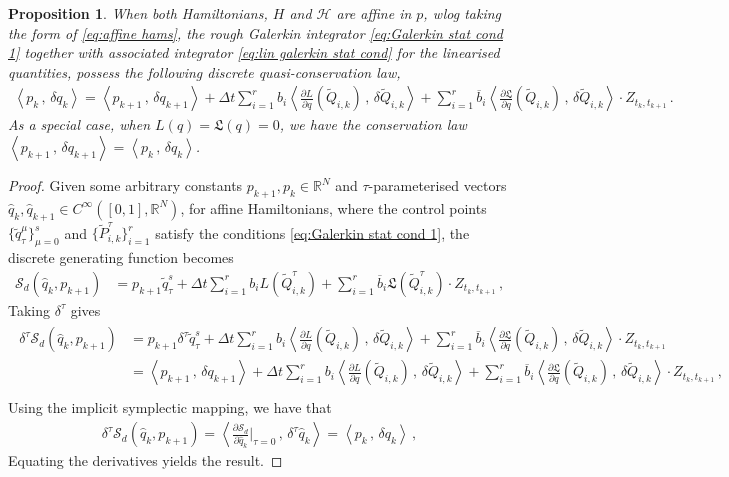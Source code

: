 \documentclass[11pt, oneside]{article}
\numberwithin{equation}{section}
\newtheorem{proposition}[lemma]{Proposition}
\theoremstyle{definition}
\newcommand{\ob}[1]{\overline{#1}}
\newcommand{\wt}[1]{\widetilde{#1}}
\newcommand{\wh}[1]{\widehat{#1}}
\newcommand{\mc}[1]{\mathcal{#1}}
\newcommand{\mcal}[1]{\mc{#1}}
\newcommand{\scp}[2]{{\left\langle {#1}\, , \, {#2}\right\rangle}}
\def\p{{\partial}}
\def\p{\partial}
\begin{document}
\begin{proposition}\label{prop:numerical 1-form conservation}
    When both Hamiltonians, $H$ and $\mcal{H}$ are affine in $p$, wlog taking the form of \eqref{eq:affine hams}, the rough Galerkin integrator \eqref{eq:Galerkin stat cond 1} together with associated integrator \eqref{eq:lin galerkin stat cond} for the linearised quantities, possess the following discrete quasi-conservation law,
    \begin{align}\label{eq:numerical 1-form conservation}
        \scp{p_k}{\delta q_k} = \scp{p_{k+1}}{\delta q_{k+1}} + \Delta t\sum_{i=1}^r b_i \scp{\frac{\p L}{\p q}(\wt{Q}_{i,k})}{\delta \wt{Q}_{i,k}} + \sum_{i=1}^r \ob{b}_i\scp{\frac{\p \mathfrak{L}}{\p q}(\wt{Q}_{i,k})}{\delta \wt{Q}_{i,k}}\cdot Z_{t_k, t_{k+1}}\,.
    \end{align}
    As a special case, when $L(q) = \mathfrak{L}(q) = 0$, we have the conservation law $\scp{p_{k+1}}{\delta q_{k+1}} = \scp{p_k}{\delta q_k}$.
\end{proposition}
\begin{proof}
Given some arbitrary constants $p_{k+1}, p_k \in \mathbb{R}^N$ and $\tau$-parameterised vectors $\wh{q}_k, \wh{q}_{k+1} \in C^\infty([0,1], \mathbb{R}^N)$, for affine Hamiltonians, where the control points $\{\wt{q}^\mu_\tau\}_{\mu=0}^s$ and $\{\wt{P}^\tau_{i,k}\}_{i=1}^r$ satisfy the conditions \eqref{eq:Galerkin stat cond 1}, the discrete generating function becomes
    \begin{align*}
    \mcal{S}_d(\wh{q}_k, p_{k+1})&= p_{k+1}\wt{q}^s_\tau + \Delta t \sum_{i=1}^r b_i L(\wt{Q}^\tau_{i,k}) + \sum_{i=1}^r \ob{b}_i\mathfrak{L}(\wt{Q}^\tau_{i,k})\cdot Z_{t_k, t_{k+1}}\,,
    \end{align*}
    Taking $\delta^\tau$ gives
    \begin{align*}
        \begin{split}
            \delta^\tau \mcal{S}_d(\wh{q}_k, p_{k+1}) &= p_{k+1}\delta^\tau \wt{q}^s_\tau + \Delta t\sum_{i=1}^rb_i\scp{\frac{\p L}{\p q}(\wt{Q}_{i,k})}{\delta \wt{Q}_{i,k}} +  \sum_{i=1}^r \ob{b}_i\scp{\frac{\p \mathfrak{L}}{\p q}(\wt{Q}_{i,k})}{\delta \wt{Q}_{i,k}}\cdot Z_{t_k, t_{k+1}}\\
            &= \scp{p_{k+1}}{\delta q_{k+1}} + \Delta t\sum_{i=1}^rb_i\scp{\frac{\p L}{\p q}(\wt{Q}_{i,k})}{\delta \wt{Q}_{i,k}} + \sum_{i=1}^r \ob{b}_i\scp{\frac{\p \mathfrak{L}}{\p q}(\wt{Q}_{i,k})}{\delta \wt{Q}_{i,k}}\cdot Z_{t_k, t_{k+1}}\,,\\
        \end{split}
    \end{align*}
    Using the implicit symplectic mapping, we have that 
    \begin{align*}
        \delta^\tau \mcal{S}_d(\wh{q}_k, p_{k+1}) = \scp{\frac{\p \mcal{S}_d}{\p \wh{q}_k}\bigg|_{\tau = 0}}{\delta^\tau \wh{q}_k} = \scp{p_k}{\delta q_k}\,,
    \end{align*}
    Equating the derivatives yields the result.
\end{proof}
\end{document}
